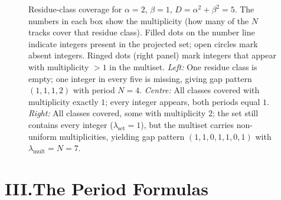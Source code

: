 \documentclass{amsart}
\theoremstyle{definition}
\theoremstyle{plain}
\theoremstyle{remark}
\begin{document}
\begin{figure}[ht]
{
}%
\caption{Residue-class coverage for $\alpha=2$, $\beta=1$, $D=\alpha^2+\beta^2=5$.
  The numbers in each box show the multiplicity (how many of the $N$ tracks cover
  that residue class).
  Filled dots on the number line indicate integers present in the projected set;
  open circles mark absent integers.
  Ringed dots (right panel) mark integers that appear with multiplicity $>1$ in the
  multiset.
  \emph{Left:} One residue class is empty; one integer in every five is missing,
  giving gap pattern $(1,1,1,2)$ with period $N=4$.
  \emph{Centre:} All classes covered with multiplicity exactly $1$; every integer
  appears, both periods equal $1$.
  \emph{Right:} All classes covered, some with multiplicity $2$; the set still
  contains every integer ($\lambda_{\mathrm{set}}=1$), but the multiset carries
  non-uniform multiplicities, yielding gap pattern $(1,1,0,1,1,0,1)$ with
  $\lambda_{\mathrm{mult}}=N=7$.}
\label{fig:residue}
\end{figure}

\section*{III.\enspace The Period Formulas}
\end{document}
